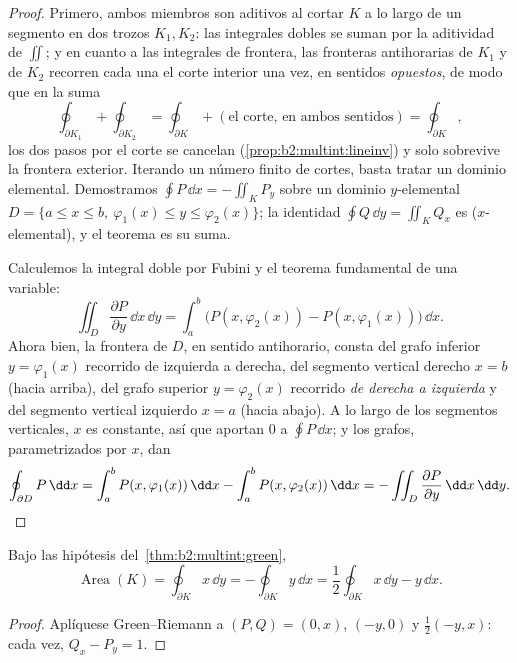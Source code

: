 \begin{proof}
Primero, ambos miembros son aditivos al cortar $K$ a lo largo de un
segmento en dos trozos $K_1, K_2$: las integrales dobles se suman por
la aditividad de $\iint$; y en cuanto a las integrales de frontera,
las fronteras antihorarias de $K_1$ y de $K_2$ recorren cada una el
corte interior una vez, en sentidos \emph{opuestos}, de modo que en
la suma
\[
\oint_{\partial K_1} + \oint_{\partial K_2}
= \oint_{\partial K} + (\text{el corte, en ambos sentidos})
= \oint_{\partial K},
\]
los dos pasos por el corte se cancelan
(\cref{prop:b2:multint:lineinv}) y solo sobrevive la frontera
exterior. Iterando un número finito de cortes, basta tratar un
dominio elemental. Demostramos $\oint P\,\dd x = -\iint_K P_y$ sobre
un dominio $y$-elemental $D = \{a \leq x \leq b,\ \varphi_1(x) \leq y
\leq \varphi_2(x)\}$; la identidad $\oint Q\,\dd y = \iint_K Q_x$ es
 ($x$-elemental), y el teorema es su suma.

Calculemos la integral doble por Fubini y el teorema fundamental de
una variable:
\[
\iint_D \frac{\partial P}{\partial y}\,\dd x\,\dd y
= \int_a^b \bigl(P(x, \varphi_2(x)) - P(x, \varphi_1(x))\bigr)
\,\dd x .
\]
Ahora bien, la frontera de $D$, en sentido antihorario, consta del
grafo inferior $y = \varphi_1(x)$ recorrido de izquierda a derecha,
del segmento vertical derecho $x = b$ (hacia arriba), del grafo
superior $y = \varphi_2(x)$ recorrido \emph{de derecha a izquierda} y
del segmento vertical izquierdo $x = a$ (hacia abajo). A lo largo de
los segmentos verticales, $x$ es constante, así que aportan $0$ a
$\oint P\,\dd x$; y los grafos, parametrizados por $x$, dan
\[
\oint_{\partial D} P\,\dd x
= \int_a^b P(x, \varphi_1(x))\,\dd x
- \int_a^b P(x, \varphi_2(x))\,\dd x
= -\iint_D \frac{\partial P}{\partial y}\,\dd x\,\dd y .
\qedhere
\]
\end{proof}

\begin{corollary}\label{cor:b2:multint:area}
Bajo las hipótesis del~\cref{thm:b2:multint:green},
\[
\operatorname{Area}(K)
= \oint_{\partial K} x\,\dd y
= -\oint_{\partial K} y\,\dd x
= \frac12\oint_{\partial K} x\,\dd y - y\,\dd x .
\]
\end{corollary}

\begin{proof}
Aplíquese Green--Riemann a $(P, Q) = (0, x)$, $(-y, 0)$ y
$\frac12(-y, x)$: cada vez, $Q_x - P_y = 1$.
\end{proof}

